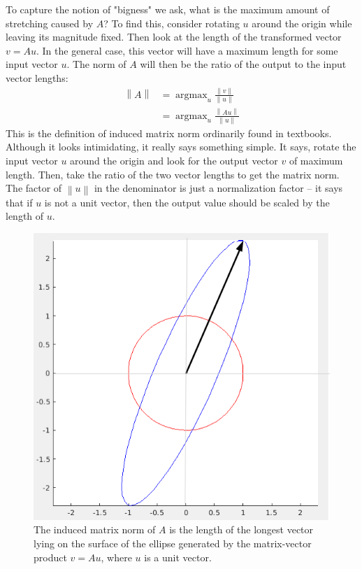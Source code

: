 \documentclass[onefignum,onetabnum]{siamart190516}
\DeclareMathOperator*{\argmax}{argmax}
\begin{document}
To capture the notion of "bigness" we ask, what is the maximum
amount of stretching caused by $A$?  To find this, consider rotating $u$
around the origin while leaving its magnitude fixed.  Then look at the
length of the transformed vector $v = A u$.  In the general case, this
vector will have a maximum length for some input vector $u$.  The norm
of $A$ will then be the ratio of the output to the input vector lengths:
\begin{equation*}
  \label{eq:inducednorm}
\begin{aligned}
\left\lVert {A}\right\rVert 
& = \argmax_u \frac{\left\lVert{v}\right\rVert}{\left\lVert{u}\right\rVert} \\
& = \argmax_u \frac{\left\lVert{A u}\right\rVert}{\left\lVert{u}\right\rVert}
\end{aligned}
\end{equation*}
This is the definition of induced matrix norm ordinarily found in
textbooks.  Although it looks intimidating, it really says something simple.
It says, rotate the input vector $u$ around the origin and look for the
output vector $v$ of maximum length.  
Then, take the ratio of the two vector lengths to get the matrix norm.
The factor of 
$\left\lVert{u}\right\rVert$ in the
denominator is just a normalization factor -- it says that if $u$ is not
a unit vector, then the output value should be scaled by the length of $u$.
\begin{figure}[H]
	\centering
	\includegraphics[width=0.6\columnwidth]{InducedMatrixNormWithArrow.png}
	\caption{The induced matrix norm of $A$ is the length of the longest vector
		lying on the surface of the ellipse generated by the matrix-vector
		product $v = A u$, where $u$ is a unit vector.}
	\label{fig:InducedMatrixNormWithArrow}
\end{figure}
\FloatBarrier 
\end{document}
